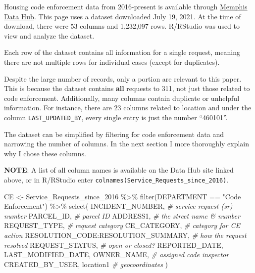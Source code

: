\documentclass[
]{book}
\newenvironment{Shaded}{\begin{snugshade}}{\end{snugshade}}
\newcommand{\CommentTok}[1]{\textcolor[rgb]{0.56,0.35,0.01}{\textit{#1}}}
\newcommand{\FunctionTok}[1]{\textcolor[rgb]{0.00,0.00,0.00}{#1}}
\newcommand{\NormalTok}[1]{#1}
\newcommand{\OtherTok}[1]{\textcolor[rgb]{0.56,0.35,0.01}{#1}}
\newcommand{\SpecialCharTok}[1]{\textcolor[rgb]{0.00,0.00,0.00}{#1}}
\newcommand{\StringTok}[1]{\textcolor[rgb]{0.31,0.60,0.02}{#1}}
\begin{document}
Housing code enforcement data from 2016-present is available through \href{https://data.memphistn.gov/dataset/Service-Requests-since-2016/hmd4-ddta}{Memphis Data Hub}. This page uses a dataset downloaded July 19, 2021. At the time of download, there were 53 columns and 1,232,097 rows. R/RStudio was used to view and analyze the dataset.

Each row of the dataset contains all information for a single request, meaning there are not multiple rows for individual cases (except for duplicates).

Despite the large number of records, only a portion are relevant to this paper. This is because the dataset contains \textbf{all} requests to 311, not just those related to code enforcement. Additionally, many columns contain duplicate or unhelpful information. For instance, there are 23 columns related to location and under the column \texttt{LAST\_UPDATED\_BY}, every single entry is just the number ``460101''.

The dataset can be simplified by filtering for code enforcement data and narrowing the number of columns. In the next section I more thoroughly explain why I chose these columns.

\textbf{NOTE}: A list of all column names is available on the Data Hub site linked above, or in R/RStudio enter \texttt{colnames(Service\_Requests\_since\_2016)}.

\begin{Shaded}
\begin{Highlighting}[]
\NormalTok{CE }\OtherTok{\textless{}{-}}\NormalTok{ Service\_Requests\_since\_2016 }\SpecialCharTok{\%\textgreater{}\%}
  \FunctionTok{filter}\NormalTok{(DEPARTMENT }\SpecialCharTok{==} \StringTok{"Code Enforcement"}\NormalTok{) }\SpecialCharTok{\%\textgreater{}\%}
  \FunctionTok{select}\NormalTok{(}
\NormalTok{    INCIDENT\_NUMBER, }\CommentTok{\#\textquotesingle{} service request (sr) number}
\NormalTok{    PARCEL\_ID, }\CommentTok{\#\textquotesingle{} parcel ID}
\NormalTok{    ADDRESS1, }\CommentTok{\#\textquotesingle{} the street name \& number}
\NormalTok{    REQUEST\_TYPE, }\CommentTok{\#\textquotesingle{} request category}
\NormalTok{    CE\_CATEGORY, }\CommentTok{\#\textquotesingle{} category for CE action}
\NormalTok{    RESOLUTION\_CODE}\SpecialCharTok{:}\NormalTok{RESOLUTION\_SUMMARY, }\CommentTok{\#\textquotesingle{} how the request resolved}
\NormalTok{    REQUEST\_STATUS, }\CommentTok{\#\textquotesingle{} open or closed?}
\NormalTok{    REPORTED\_DATE, }
\NormalTok{    LAST\_MODIFIED\_DATE, }
\NormalTok{    OWNER\_NAME, }\CommentTok{\#\textquotesingle{} assigned code inspector}
\NormalTok{    CREATED\_BY\_USER,}
\NormalTok{    location1 }\CommentTok{\#\textquotesingle{} geocoordinates}
\NormalTok{  )}
\end{Highlighting}
\end{Shaded}
\end{document}
